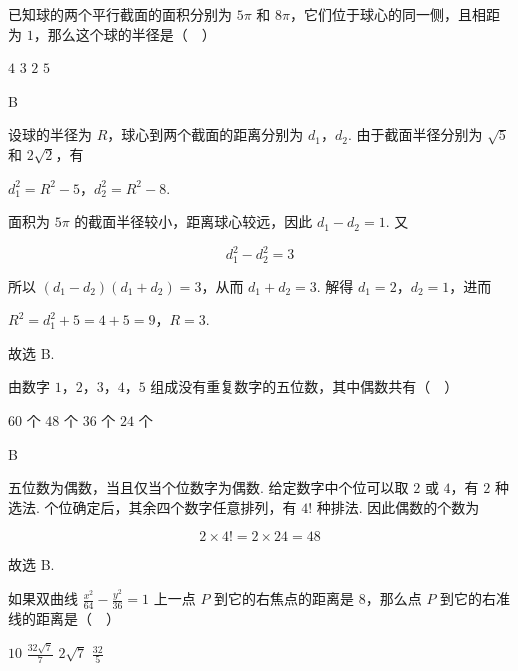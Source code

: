 \documentclass[UTF8,a4paper,oneside,11pt]{ctexbook}
\begin{document}
\begin{problem}
已知球的两个平行截面的面积分别为 \(5\pi\) 和 \(8\pi\)，它们位于球心的同一侧，且相距为 \(1\)，那么这个球的半径是（\(\quad\)）

\choices
    {\(4\)}
    {\(3\)}
    {\(2\)}
    {\(5\)}
\end{problem}

\begin{answer}
B
\end{answer}

\begin{solution}
设球的半径为 \(R\)，球心到两个截面的距离分别为 \(d_1\)，\(d_2\). 由于截面半径分别为 \(\sqrt5\) 和 \(2\sqrt2\)，有

\(d_1^2=R^2-5\)，\(d_2^2=R^2-8\).

面积为 \(5\pi\) 的截面半径较小，距离球心较远，因此 \(d_1-d_2=1\). 又

\[d_1^2-d_2^2=3\]

所以 \((d_1-d_2)(d_1+d_2)=3\)，从而 \(d_1+d_2=3\). 解得 \(d_1=2\)，\(d_2=1\)，进而

\(R^2=d_1^2+5=4+5=9\)，\(R=3\).

故选 B.
\end{solution}

\begin{problem}
由数字 \(1\)，\(2\)，\(3\)，\(4\)，\(5\) 组成没有重复数字的五位数，其中偶数共有（\(\quad\)）

\choices
    {\(60\text{ 个}\)}
    {\(48\text{ 个}\)}
    {\(36\text{ 个}\)}
    {\(24\text{ 个}\)}
\end{problem}

\begin{answer}
B
\end{answer}

\begin{solution}
五位数为偶数，当且仅当个位数字为偶数. 给定数字中个位可以取 \(2\) 或 \(4\)，有 \(2\) 种选法. 个位确定后，其余四个数字任意排列，有 \(4!\) 种排法. 因此偶数的个数为

\[2\times4!=2\times24=48\]

故选 B.
\end{solution}

\begin{problem}
如果双曲线 \(\frac{x^2}{64} - \frac{y^2}{36} = 1\) 上一点 \(P\) 到它的右焦点的距离是 \(8\)，那么点 \(P\) 到它的右准线的距离是（\(\quad\)）

\choices
    {\(10\)}
    {\(\frac{32\sqrt{7}}{7}\)}
    {\(2\sqrt{7}\)}
    {\(\frac{32}{5}\)}
\end{problem}
\end{document}
